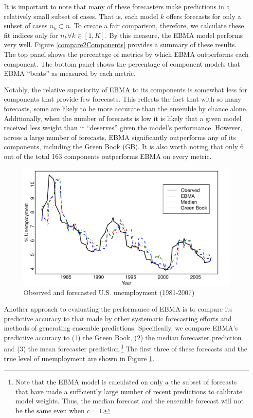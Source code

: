 \documentclass[12pt,fullpage,endnotes]{article}
\begin{document}
It is important to note that many of these forecasters make
predictions in a relatively small subset of cases.  That is, each
model $k$ offers forecasts for only a subset of cases $n_k \subset n$.
To create a fair comparison, therefore, we calculate these fit indices
only for $n_k \forall k \in [1,K]$.  By this measure, the EBMA model
performs very well.  Figure \ref{compare2Components} provides a
summary of these results.  The top panel shows the percentage of
metrics by which EBMA outperforms each component. The bottom panel
shows the percentage of component models that EBMA ``beats'' as
measured by each metric.

Notably, the relative superiority of EBMA to its components is
somewhat less for components that provide few forecasts.  This
reflects the fact that with so many forecasts, some are likely to be
more accurate than the ensemble by chance alone. Additionally, when
the number of forecasts is low it is likely that a given model
received less weight than it ``deserves'' given the model's
performance.  However, across a large number of forecasts, EBMA
significantly outperforms any of its components, including the Green
Book (GB).  It is also worth noting that only 6 out of the total 163
components outperforms EBMA on every metric.

\begin{figure}[h]
\caption{Observed and forecasted U.S. unemployment (1981-2007)}
\label{timeSeries}
\begin{center}
\includegraphics[scale=.8]{timeSeries}
\end{center}
\end{figure}


Another approach to evaluating the performance of EBMA is to compare
its predictive accuracy to that made by other systematic forecasting
efforts and methods of generating ensemble predictions.  Specifically,
we compare EBMA's predictive accuracy to (1) the Green Book, (2) the
median forecaster prediction and (3) the mean forecaster
prediction.\footnote{Note that the EBMA model is calculated on only a the
  subset of forecasts that have made a sufficiently large number of
  recent predictions to calibrate model weights.  Thus, the median
  forecast and the ensemble forecast will not be the same even when
  $c=1$.  }  The first three of these forecasts and the true level of
unemployment are shown in Figure \ref{timeSeries}.
\end{document}
